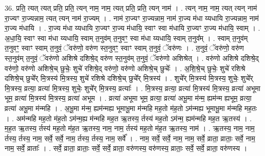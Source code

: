 \documentclass[17pt]{extarticle}
\begin{document}
36. प्रति॒ त्यत् त्यत् प्रति॒ प्रति॒ त्यन् नाम॒ नाम॒ त्यत् प्रति॒ प्रति॒ त्यन् नाम॑ । . त्यन् नाम॒ नाम॒ त्यत् त्यन् नाम॑ रा॒ज्यꣳ रा॒ज्यन्नाम॒ त्यत् त्यन् नाम॑ रा॒ज्यम् । . नाम॑ रा॒ज्यꣳ रा॒ज्यन्नाम॒ नाम॑ रा॒ज्य म॑धा य्यधायि रा॒ज्यन्नाम॒ नाम॑ रा॒ज्य म॑धायि । . रा॒ज्य म॑धा य्यधायि रा॒ज्यꣳ रा॒ज्य म॑धायि॒ स्वाꣳ स्वा म॑धायि रा॒ज्यꣳ रा॒ज्य म॑धायि॒ स्वाम् । . अ॒धा॒यि॒ स्वाꣳ स्वा म॑धा य्यधायि॒ स्वाम् त॒नुव॑म् त॒नुवꣳ॒॒ स्वा म॑धा य्यधायि॒ स्वाम् त॒नुव᳚म् । . स्वाम् त॒नुव॑म् त॒नुवꣳ॒॒ स्वाꣳ स्वाम् त॒नुवं॒ ॅवरु॑णो॒ वरु॑ण स्त॒नुवꣳ॒॒ स्वाꣳ स्वाम् त॒नुवं॒ ॅवरु॑णः । . त॒नुवं॒ ॅवरु॑णो॒ वरु॑ण स्त॒नुव॑म् त॒नुवं॒ ॅवरु॑णो अशिश्रे दशिश्रे॒द् वरु॑ण स्त॒नुव॑म् त॒नुवं॒ ॅवरु॑णो अशिश्रेत् । . वरु॑णो अशिश्रे दशिश्रे॒द् वरु॑णो॒ वरु॑णो अशिश्रे॒च् छुचेः॒ शुचे॑ रशिश्रे॒द् वरु॑णो॒ वरु॑णो अशिश्रे॒च् छुचेः᳚ । . अ॒शि॒श्रे॒च् छुचेः॒ शुचे॑ रशिश्रे दशिश्रे॒च् छुचे᳚र् मि॒त्रस्य॑ मि॒त्रस्य॒ शुचे॑ रशिश्रे दशिश्रे॒च् छुचे᳚र् मि॒त्रस्य॑ । . शुचे᳚र् मि॒त्रस्य॑ मि॒त्रस्य॒ शुचेः॒ शुचे᳚र् मि॒त्रस्य॒ व्रत्या॒ व्रत्या॑ मि॒त्रस्य॒ शुचेः॒ शुचे᳚र् मि॒त्रस्य॒ व्रत्याः᳚ । . मि॒त्रस्य॒ व्रत्या॒ व्रत्या॑ मि॒त्रस्य॑ मि॒त्रस्य॒ व्रत्या॑ अभूमा भूम॒ व्रत्या॑ मि॒त्रस्य॑ मि॒त्रस्य॒ व्रत्या॑ अभूम । . व्रत्या॑ अभूमा भूम॒ व्रत्या॒ व्रत्या॑ अभू॒मा म॑न्म॒ ह्यम॑न्म ह्यभूम॒ व्रत्या॒ व्रत्या॑ अभू॒मा म॑न्महि । . अ॒भू॒मा म॑न्म॒ ह्यम॑न्मह्य भूमाभू॒मा म॑न्महि मह॒तो म॑ह॒तो ऽम॑न्मह्य भूमाभू॒मा म॑न्महि मह॒तः । . अम॑न्महि मह॒तो म॑ह॒तो ऽम॑न्म॒ह्य म॑न्महि मह॒त ऋ॒तस्य॒ र्तस्य॑ मह॒तो ऽम॑न्म॒ ह्यम॑न्महि मह॒त ऋ॒तस्य॑ । . म॒ह॒त ऋ॒तस्य॒ र्तस्य॑ मह॒तो म॑ह॒त ऋ॒तस्य॒ नाम॒ नाम॒ र्तस्य॑ मह॒तो म॑ह॒त ऋ॒तस्य॒ नाम॑ । . ऋ॒तस्य॒ नाम॒ नाम॒ र्तस्य॒ र्तस्य॒ नाम॒ सर्वे॒ सर्वे॒ नाम॒ र्तस्य॒ र्तस्य॒ नाम॒ सर्वे᳚ । . नाम॒ सर्वे॒ सर्वे॒ नाम॒ नाम॒ सर्वे॒ व्राता॒ व्राताः॒ सर्वे॒ नाम॒ नाम॒ सर्वे॒ व्राताः᳚ । . सर्वे॒ व्राता॒ व्राताः॒ सर्वे॒ सर्वे॒ व्राता॒ वरु॑णस्य॒ वरु॑णस्य॒ व्राताः॒ सर्वे॒ सर्वे॒ व्राता॒ वरु॑णस्य । \newline
\end{document}
